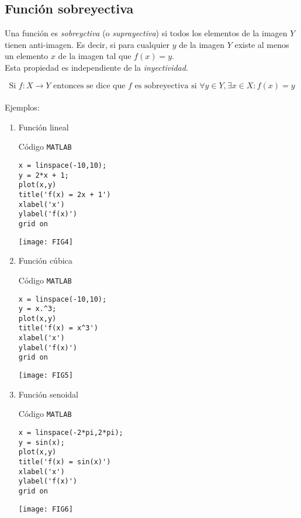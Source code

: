 \documentclass[a4paper,12pt]{article}
\begin{document}
\vspace{1cm}

\subsection*{Función sobreyectiva}

\vspace{1cm}

Una función es \emph{sobreyctiva} (o \emph{suprayectiva}) si todos los elementos de la imagen $Y$ tienen anti-imagen. Es decir, si para cualquier $y$ de la imagen $Y$ existe al menos un elemento $x$ de la imagen tal que $f(x) = y$. \\

Esta propiedad es independiente de la \emph{inyectividad}.

\[ \text{Si } f : X \rightarrow Y \text{ entonces se dice que } f \text{ es sobreyectiva si } \forall y \in Y, \exists x \in X : f(x) = y \] \\

\vspace{1cm}
Ejemplos:


\begin{enumerate}
	\centering
	\item Función lineal
		\begin{multicols}{2}
		Código \texttt{MATLAB}
		\begin{lstlisting}[style=Matlab-editor]
x = linspace(-10,10);
y = 2*x + 1;
plot(x,y)
title('f(x) = 2x + 1')
xlabel('x')
ylabel('f(x)')
grid on
		\end{lstlisting}
		\columnbreak
			\texttt{[image: FIG4]}
		\end{multicols}
	
	\item Función cúbica
		\begin{multicols}{2}
		Código \texttt{MATLAB}
		\begin{lstlisting}[style=Matlab-editor]
x = linspace(-10,10);
y = x.^3;
plot(x,y)
title('f(x) = x^3')
xlabel('x')
ylabel('f(x)')
grid on
		\end{lstlisting}
		\columnbreak
			\texttt{[image: FIG5]}
		\end{multicols}

		\item Función senoidal
		\begin{multicols}{2}
		Código \texttt{MATLAB}
		\begin{lstlisting}[style=Matlab-editor]
x = linspace(-2*pi,2*pi);
y = sin(x);
plot(x,y)
title('f(x) = sin(x)')
xlabel('x')
ylabel('f(x)')
grid on
		\end{lstlisting}
		\columnbreak
			\texttt{[image: FIG6]}
		\end{multicols}

\end{enumerate}
\end{document}
